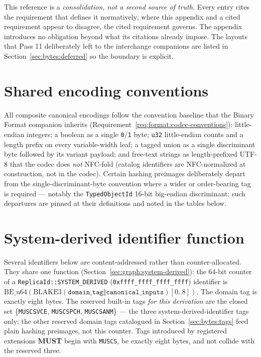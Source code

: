 \documentclass[11pt,letterpaper]{report}
\newcounter{requirement}[chapter]
\newcommand{\MUST}{\textbf{MUST}}
\begin{document}
This reference is a \emph{consolidation, not a second source of truth.}
Every entry cites the requirement that defines it normatively; where
this appendix and a cited requirement appear to disagree, the cited
requirement governs. The appendix introduces no obligation beyond what
its citations already impose. The layouts that Pass 11 deliberately
left to the interchange companions are listed in
Section~\ref{sec:bytes:deferred} so the boundary is explicit.

\section{Shared encoding conventions}
\label{sec:bytes:conventions}

All composite canonical encodings follow the convention baseline that
the Binary Format companion inherits
(Requirement~\ref{req:format:codec-conventions}): little-endian
integers; a boolean as a single \texttt{0}/\texttt{1} byte; \texttt{u32}
little-endian counts and a length prefix on every variable-width leaf;
a tagged union as a single discriminant byte followed by its variant
payload; and free-text strings as length-prefixed UTF-8 that the codec
does \emph{not} NFC-fold (catalog identifiers are NFC-normalized at
construction, not in the codec). Certain hashing preimages deliberately
depart from the single-discriminant-byte convention where a wider or
order-bearing tag is required --- notably the \texttt{TypedObjectId}
16-bit big-endian discriminant; such departures are pinned at their
definitions and noted in the tables below.

\section{System-derived identifier function}
\label{sec:bytes:system-derived}

Several identifiers below are content-addressed rather than
counter-allocated. They share one function
(Section~\ref{sec:graph:system-derived}): the 64-bit counter of a
\texttt{ReplicaId::SYSTEM\_DERIVED}
(\texttt{0xffff\_ffff\_ffff\_ffff}) identifier is
$\mathrm{BE\_u64}(\mathrm{BLAKE3}(\texttt{domain\_tag} \Vert
\texttt{canonical\_inputs})[0..8])$. The domain tag is exactly eight
bytes. The reserved built-in tags \emph{for this derivation} are the
closed set \{\texttt{MUSCSVCE}, \texttt{MUSCSPCH}, \texttt{MUSCSANM}\}
--- the three system-derived-identifier tags only; the other reserved
domain tags catalogued in Section~\ref{sec:bytes:tags} feed plain
hashing preimages, not this counter. Tags introduced by registered
extensions \MUST{} begin with \texttt{MUSCS}, be exactly eight bytes,
and not collide with the reserved three.
\end{document}
